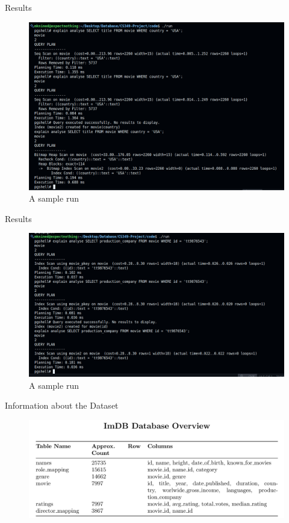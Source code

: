 \documentclass[Serif, 10pt, brown]{beamer}
\theoremstyle{example}
\theoremstyle{plain}
\begin{document}
\begin{frame}{Results}
	\begin{figure}
        \centering
        \includegraphics[width=1\linewidth]{../images/Screenshot from 2025-05-01 11-35-24.png}
        \caption{A sample run}
    \end{figure}
\end{frame}

\begin{frame}{Results}
	\begin{figure}
        \centering
        \includegraphics[width=1\linewidth]{../images/Screenshot from 2025-05-01 11-37-42.png}
        \caption{A sample run}
    \end{figure}
\end{frame}

\begin{frame}{Information about the Dataset}
	\begin{figure}
        \centering
        \includegraphics[width=1\linewidth]{../images/Screenshot from 2025-05-01 12-10-35.png}
    \end{figure}
\end{frame}
\end{document}
